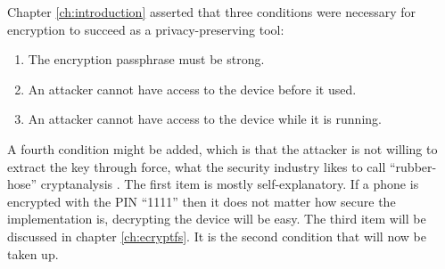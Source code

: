 \begin{samepage}
Chapter \ref{ch:introduction} asserted that three conditions were necessary for encryption to succeed as a privacy-preserving tool:

\begin{enumerate}
	\item{The encryption passphrase must be strong.}
	\item{An attacker cannot have access to the device before it used.}
	\item{An attacker cannot have access to the device while it is running.}
\end{enumerate}
\end{samepage}
A fourth condition might be added, which is that the attacker is not willing to extract the key through force, what the security
industry likes to call ``rubber-hose'' cryptanalysis \cite{rubberhose}.  The first item is mostly self-explanatory. If a phone is
encrypted with the PIN ``1111'' then it does not matter how secure the implementation is, decrypting the device will be easy. The
third item will be discussed in chapter \ref{ch:ecryptfs}.  It is the second condition that will now be taken up. 

